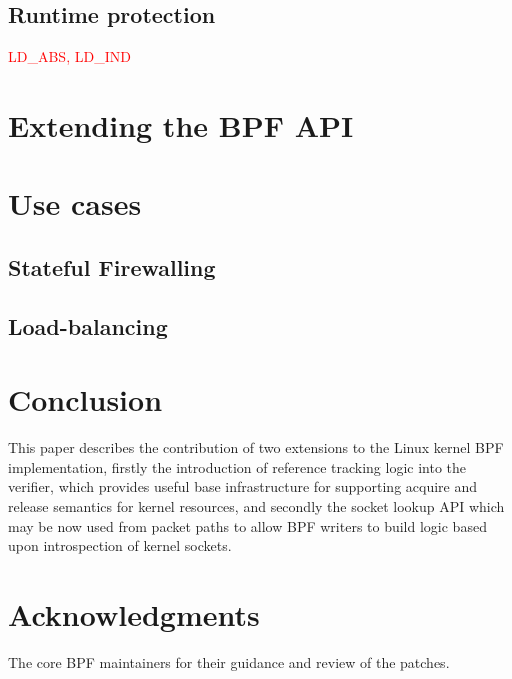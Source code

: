 \documentclass[10pt,sigconf,authorversion]{lpc}
\newcommand\todo[1]{\textcolor{red}{#1}}
\begin{document}
\subsection{Runtime protection}

\todo{LD\_ABS, LD\_IND}

\section{Extending the BPF API}



\section{Use cases}

\subsection{Stateful Firewalling}

\subsection{Load-balancing}

\section{Conclusion}

This paper describes the contribution of two extensions to the Linux kernel BPF
implementation, firstly the introduction of reference tracking logic into the
verifier, which provides useful base infrastructure for supporting acquire and
release semantics for kernel resources, and secondly the socket lookup API
which may be now used from packet paths to allow BPF writers to build logic
based upon introspection of kernel sockets.

\section{Acknowledgments}

The core BPF maintainers for their guidance and review of the patches.



\end{document}
